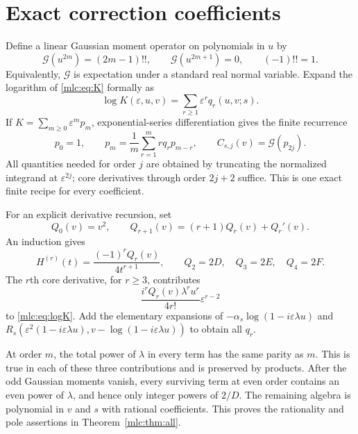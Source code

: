\documentclass[11pt]{article}
\theoremstyle{remark}\newtheorem{remark}[theorem]{Remark}
\newcommand{\eps}{\varepsilon}
\newcommand{\G}{\mathcal G}
\begin{document}
\section{Exact correction coefficients}\label{mlc:sec:coefficients}
Define a linear Gaussian moment operator on polynomials in $u$ by
\begin{equation}\label{mlc:eq:G}
 \G(u^{2m})=(2m-1)!!,\qquad \G(u^{2m+1})=0,\qquad(-1)!!=1.
\end{equation}
Equivalently, $\G$ is expectation under a standard real normal variable. Expand the logarithm of \eqref{mlc:eq:K} formally as
\begin{equation}\label{mlc:eq:logK}
 \log K(\eps,u,v)=\sum_{r\ge1}\eps^r q_r(u,v;s).
\end{equation}
If $K=\sum_{m\ge0}\eps^m p_m$, exponential-series differentiation gives the finite recurrence
\begin{equation}\label{mlc:eq:exprec}
 p_0=1,\qquad p_m=\frac1m\sum_{r=1}^{m}r q_rp_{m-r},\qquad
 C_{s,j}(v)=\G(p_{2j}).
\end{equation}
All quantities needed for order $j$ are obtained by truncating the normalized integrand at $\eps^{2j}$; core derivatives through order $2j+2$ suffice. This is one exact finite recipe for every coefficient.

For an explicit derivative recursion, set
\begin{equation}\label{mlc:eq:Qrec}
 Q_0(v)=v^2,\qquad Q_{r+1}(v)=(r+1)Q_r(v)+Q_r'(v).
\end{equation}
An induction gives
\begin{equation}\label{mlc:eq:Qderiv}
 H^{(r)}(t)=\frac{(-1)^rQ_r(v)}{4t^{r+1}},\qquad
 Q_2=2D,\quad Q_3=2E,\quad Q_4=2F.
\end{equation}
The $r$th core derivative, for $r\ge3$, contributes
\begin{equation}\label{mlc:eq:corecoefficient}
 \frac{i^rQ_r(v)\lambda^ru^r}{4r!}\eps^{r-2}
\end{equation}
to \eqref{mlc:eq:logK}. Add the elementary expansions of $-\alpha_s\log(1-i\eps\lambda u)$ and $R_s(\eps^2(1-i\eps\lambda u),v-\log(1-i\eps\lambda u))$ to obtain all $q_r$.

At order $m$, the total power of $\lambda$ in every term has the same parity as $m$. This is true in each of these three contributions and is preserved by products. After the odd Gaussian moments vanish, every surviving term at even order contains an even power of $\lambda$, and hence only integer powers of $2/D$. The remaining algebra is polynomial in $v$ and $s$ with rational coefficients. This proves the rationality and pole assertions in Theorem~\ref{mlc:thm:all}.
\end{document}
